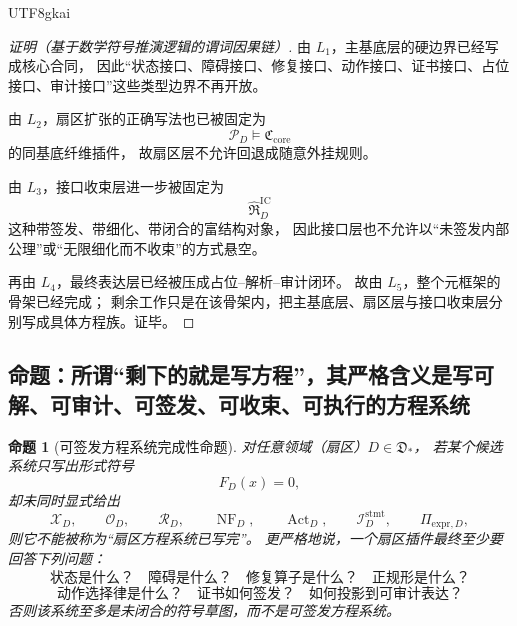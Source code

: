 \documentclass[12pt]{article}
\newtheorem{proposition}{命题}[section]
\begin{document}
\begin{CJK*}{UTF8}{gkai}
\begin{proof}[证明（基于数学符号推演逻辑的谓词因果链）]
由 $L_1$，主基底层的硬边界已经写成核心合同，
因此“状态接口、障碍接口、修复接口、动作接口、证书接口、占位接口、审计接口”这些类型边界不再开放。

由 $L_2$，扇区扩张的正确写法也已被固定为
\[
  \mathcal P_D\models \mathfrak C_{\mathrm{core}}
\]
的同基底纤维插件，
故扇区层不允许回退成随意外挂规则。

由 $L_3$，接口收束层进一步被固定为
\[
  \widehat{\mathfrak R}_D^{\mathrm{IC}}
\]
这种带签发、带细化、带闭合的富结构对象，
因此接口层也不允许以“未签发内部公理”或“无限细化而不收束”的方式悬空。

再由 $L_4$，最终表达层已经被压成占位--解析--审计闭环。
故由 $L_5$，整个元框架的骨架已经完成；
剩余工作只是在该骨架内，把主基底层、扇区层与接口收束层分别写成具体方程族。证毕。
\end{proof}

\subsection{命题：所谓“剩下的就是写方程”，其严格含义是写可解、可审计、可签发、可收束、可执行的方程系统}
\label{subsec:tex37-ch11-proposition}

\begin{proposition}[可签发方程系统完成性命题]
\label{prop:tex37-ch11-complete-equations}
对任意领域（扇区）$D\in\mathfrak D_*$，
若某个候选系统只写出形式符号
\[
  F_D(x)=0,
\]
却未同时显式给出
\[
  \mathcal X_D,
  \qquad
  \mathcal O_D,
  \qquad
  \mathcal R_D,
  \qquad
  \operatorname{NF}_D,
  \qquad
  \operatorname{Act}_D,
  \qquad
  \mathcal I_D^{\mathrm{stmt}},
  \qquad
  \Pi_{\mathrm{expr},D},
\]
则它不能被称为“扇区方程系统已写完”。
更严格地说，一个扇区插件最终至少要回答下列问题：
\[
  \text{状态是什么？}
  \quad
  \text{障碍是什么？}
  \quad
  \text{修复算子是什么？}
  \quad
  \text{正规形是什么？}
\]
\[
  \text{动作选择律是什么？}
  \quad
  \text{证书如何签发？}
  \quad
  \text{如何投影到可审计表达？}
\]
否则该系统至多是未闭合的符号草图，而不是可签发方程系统。
\end{proposition}


\end{CJK*}
\end{document}
